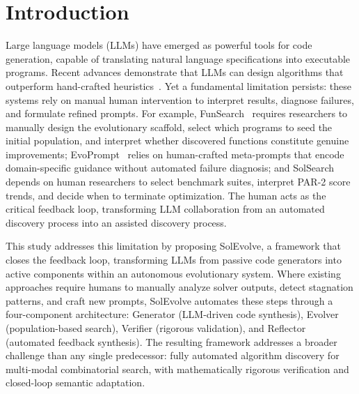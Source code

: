 \section{Introduction}\label{intro}

Large language models (LLMs) have emerged as powerful tools for code generation, capable of translating natural language specifications into executable programs. Recent advances demonstrate that LLMs can design algorithms that outperform hand-crafted heuristics~\cite{RomeraParedes2024FunSearch,Zhang2025SolSearch,Liu2024EoHS}. Yet a fundamental limitation persists: these systems rely on manual human intervention to interpret results, diagnose failures, and formulate refined prompts. For example, FunSearch~\cite{RomeraParedes2024FunSearch} requires researchers to manually design the evolutionary scaffold, select which programs to seed the initial population, and interpret whether discovered functions constitute genuine improvements; EvoPrompt~\cite{Chen2024EvoPrompt} relies on human-crafted meta-prompts that encode domain-specific guidance without automated failure diagnosis; and SolSearch~\cite{Zhang2025SolSearch} depends on human researchers to select benchmark suites, interpret PAR-2 score trends, and decide when to terminate optimization. The human acts as the critical feedback loop, transforming LLM collaboration from an automated discovery process into an assisted discovery process.

This study addresses this limitation by proposing SolEvolve, a framework that closes the feedback loop, transforming LLMs from passive code generators into active components within an autonomous evolutionary system. Where existing approaches require humans to manually analyze solver outputs, detect stagnation patterns, and craft new prompts, SolEvolve automates these steps through a four-component architecture: Generator (LLM-driven code synthesis), Evolver (population-based search), Verifier (rigorous validation), and Reflector (automated feedback synthesis). The resulting framework addresses a broader challenge than any single predecessor: fully automated algorithm discovery for multi-modal combinatorial search, with mathematically rigorous verification and closed-loop semantic adaptation.

